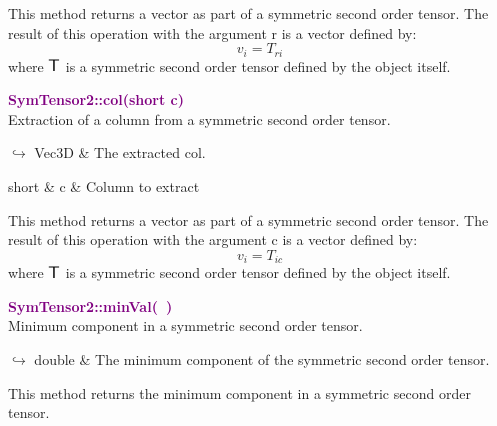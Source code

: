 This method returns a vector as part of a symmetric second order tensor.
The result of this operation with the argument r is a vector defined by:
\begin{equation*}
v_{i} = T_{ri}
\end{equation*}
where $\mbox{\large\ensuremath{\mathsf{T}}}$ is a symmetric second order tensor defined by the object itself.

\textcolor{purple}{\textbf{SymTensor2::col(short c)}}\label{SymTensor2::col(short c)}\\
Extraction of a column from a symmetric second order tensor.\vspace*{-0.5em}
\begin{tcolorbox}[grow to left by=-1cm, width=\textwidth-1cm,myArgs,tabularx={l|R}]
$\hookrightarrow$ Vec3D & The extracted col.
\end{tcolorbox}

\begin{tcolorbox}[width=\textwidth,myArgs,tabularx={ll|R}]
short & c & Column to extract
\end{tcolorbox}

This method returns a vector as part of a symmetric second order tensor.
The result of this operation with the argument c is a vector defined by:
\begin{equation*}
v_{i} = T_{ic}
\end{equation*}
where $\mbox{\large\ensuremath{\mathsf{T}}}$ is a symmetric second order tensor defined by the object itself.

\textcolor{purple}{\textbf{SymTensor2::minVal(~)}}\label{SymTensor2::minVal()}\\
Minimum component in a symmetric second order tensor.\vspace*{-0.5em}
\begin{tcolorbox}[grow to left by=-1cm, width=\textwidth-1cm,myArgs,tabularx={l|R}]
$\hookrightarrow$ double & The minimum component of the symmetric second order tensor.
\end{tcolorbox}

This method returns the minimum component in a symmetric second order tensor.


